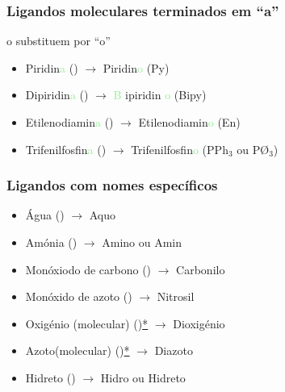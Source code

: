 \documentclass[12pt]{report}
\begin{document}
\vspace{0.5cm}\noindent%
\begin{minipage}{\textwidth}

\hypertarget{regras9}{}%
\subsubsection{Ligandos moleculares terminados em ``a''}%

o substituem por ``o''
\vspace{0.25cm}

\begin{itemize}
 	\item 
		Piridin\textcolor{LightGreen}{a} ()
		$\to$ Piridin\textcolor{LightGreen}{o} (Py)
	\item
		Dipiridin\textcolor{LightGreen}{a} ()
		$\to$ \textcolor{LightGreen}{B}%
				ipiridin%
				\textcolor{LightGreen}{o}
				(Bipy)
	\item
		Etilenodiamin\textcolor{LightGreen}{a} ()
		$\to$	Etilenodiamin\textcolor{LightGreen}{o} (En)
	\item
		Trifenilfosfin\textcolor{LightGreen}{a} ()
		$\to$ Trifenilfosfin\textcolor{LightGreen}{o} 
				(PPh$_3$ ou P\O$_3$)
\end{itemize}

\end{minipage}

\hypertarget{regras10}{}%
\subsubsection{Ligandos com nomes específicos}

\begin{itemize}
	
	\item Água () $\to$ Aquo
	\item Amónia () $\to$ Amino ou Amin
	\item Monóxiodo de carbono () $\to$ Carbonilo
	\item Monóxido de azoto () $\to$ Nitrosil
	\item 
		Oxigénio (molecular) ()\hyperlink{o2n2}{*}
		$\to$ Dioxigénio
	\item 
		Azoto(molecular) ()\hyperlink{o2n2}{*}
		$\to$ Diazoto
	\item Hidreto () $\to$ Hidro ou Hidreto
\end{itemize}
\end{document}
